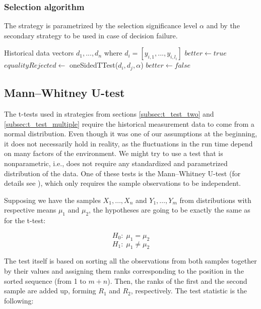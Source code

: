 \subsubsection{Selection algorithm}

The strategy is parametrized by the selection significance level $\alpha$ and by the secondary strategy to be used in case of decision failure.

\begin{algorithmic}[1] %
	\INPUT Historical data vectors $d_1,...,d_n$ where $d_i = [y_{i,1},...,y_{i,l_i}]$
		\State $better \gets true$
			\State $equalityRejected \gets$ oneSidedTTest($d_i, d_j, \alpha$)
				\State $better \gets false$
			\EndIf
		\EndFor
			\State {}
		\EndIf
	\EndFor
	\State {}
	
\end{algorithmic}

\subsection{Mann–Whitney U-test}
\label{subsec:u_test}

The t-tests used in strategies from sections \ref{subsec:t_test_two} and \ref{subsec:t_test_multiple} require the historical measurement data to come from a normal distribution. Even though it was one of our assumptions at the beginning, it does not necessarily hold in reality, as the fluctuations in the run time depend on many factors of the environment. We might try to use a test that is nonparametric, i.e., does not require any standardized and parametrized distribution of the data. One of these tests is the Mann–Whitney U-test (for details see \cite{weiss_introductory_2010}), which only requires the sample observations to be independent.

Supposing we have the samples $X_1, \dots, X_n$ and $Y_1, \dots, Y_m$ from distributions with respective means $\mu_1$ and $\mu_2$, the hypotheses are going to be exactly the same as for the t-test:

\[
H_0:\; \mu_1 = \mu_2
\]
\[
H_1:\; \mu_1 \ne \mu_2
\]

The test itself is based on sorting all the observations from both samples together by their values and assigning them ranks corresponding to the position in the sorted sequence (from 1 to $m+n$). Then, the ranks of the first and the second sample are added up, forming $R_1$ and $R_2$, respectively. The test statistic is the following:

